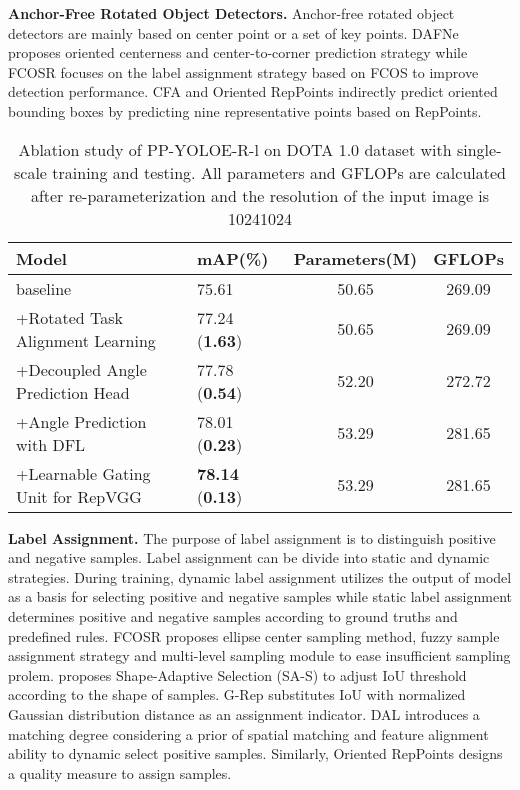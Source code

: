 \documentclass[final]{cvpr}
\begin{document}
{\bf Anchor-Free Rotated Object Detectors.} Anchor-free rotated object detectors are mainly based on center point or a set of key points. DAFNe\cite{lang2021dafne} proposes oriented centerness and center-to-corner prediction strategy while FCOSR\cite{li2021fcosr} focuses on the label assignment strategy based on FCOS\cite{tian2019fcos} to improve detection performance. CFA\cite{guo2021beyond} and Oriented RepPoints\cite{li2022oriented} indirectly predict oriented bounding boxes by predicting nine representative points based on RepPoints\cite{yang2019reppoints}.

\begin{table*}[ht]
	\begin{center}
		\begin{tabular}{l|l|c|c}
			\hline
			Model & mAP(\%) & Parameters(M) & GFLOPs \\
			\hline \hline
			
			baseline & 75.61 & 50.65 & 269.09  \\
			\hline
			
			 +Rotated Task Alignment Learning & 77.24 (\textcolor[RGB]{225,10,10}{\small\textbf{1.63}}) &    50.65  & 269.09     \\
			 +Decoupled Angle Prediction Head & 77.78 (\textcolor[RGB]{225,10,10}{\small\textbf{0.54}}) &    52.20  & 272.72        \\			
			 +Angle Prediction with DFL       & 78.01 (\textcolor[RGB]{225,10,10}{\small\textbf{0.23}}) &    53.29  & 281.65        \\
			 +Learnable Gating Unit for RepVGG   &  \textbf{78.14} (\textcolor[RGB]{225,10,10}{\small\textbf{0.13}}) & 53.29 & 281.65  \\
			\hline
		\end{tabular}
	\end{center}
	
	\caption{Ablation study of PP-YOLOE-R-l on DOTA 1.0 dataset with single-scale training and testing. All parameters and GFLOPs are calculated after re-parameterization and the resolution of the input image is 10241024}
	\label{roadmap}
\end{table*}


{\bf Label Assignment.} The purpose of label assignment is to distinguish positive and negative samples. Label assignment can be divide into static and dynamic strategies. During training, dynamic label assignment utilizes the output of model as a basis for selecting positive and negative samples while static label assignment determines positive and negative samples according to ground truths and predefined rules. FCOSR\cite{li2021fcosr} proposes ellipse center sampling method, fuzzy sample assignment strategy and multi-level sampling module to ease insufficient sampling prolem. \cite{hou2022shape} proposes Shape-Adaptive Selection (SA-S) to adjust IoU threshold according to the shape of samples. G-Rep\cite{hou2022g} substitutes IoU with normalized Gaussian distribution distance as an assignment indicator. DAL\cite{ming2021dynamic} introduces a matching degree considering a prior of spatial matching and feature alignment ability to dynamic select positive samples. Similarly, Oriented RepPoints\cite{li2022oriented} designs a quality measure to assign samples.
\end{document}
